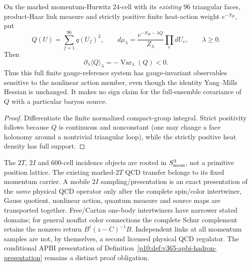 \documentclass[12pt,a4paper]{article}
\begin{document}
\begin{proposition}
\label{p10:prop:v3025-fullface-variance}
On the marked momentum-Hurwitz $24$-cell with its \emph{existing}
$96$ triangular faces, product-Haar link measure and strictly positive
finite heat-action weight $e^{-S_H}$, put
\[
 Q(U)=\sum_{f=1}^{96}q(U_f)^2,\qquad
 d\mu_\lambda=\frac{e^{-S_H-\lambda Q}}{Z_\lambda}
 \prod_{e}dU_e,\qquad \lambda\ge0.
\]
Then
\[
 \boxed{\partial_\lambda\langle Q\rangle_\lambda
 =-\operatorname{Var}_\lambda(Q)<0.}
\]
Thus this full finite gauge-reference system has gauge-invariant
observables sensitive to the nonlinear action member, even though the
identity Yang--Mills Hessian is unchanged.  It makes no sign claim for
the full-ensemble covariance of $Q$ with a particular baryon source.
\end{proposition}
\begin{proof}
Differentiate the finite normalized compact-group integral.
Strict positivity follows because $Q$ is continuous and nonconstant
(one may change a face holonomy around a nontrivial triangular loop),
while the strictly positive heat density has full support.
\end{proof}

\begin{remark}
\label{p10:rem:v3025-momentum-2i-action-owner}
The $2T$, $2I$ and $600$-cell incidence objects are rooted in
$S^3_{\rm mom}$, not a primitive position lattice.  The existing
marked-$2T$ QCD transfer belongs to its fixed momentum carrier.
A mobile $2I$ sampling/presentation is an exact presentation of the
\emph{same} physical QCD operator only after the complete spin/color
intertwiner, Gauss quotient, nonlinear action, quantum measure and
source maps are transported together.  Free/Cartan one-body
intertwiners have narrower stated domains; for general nonflat color
connections the complete Schur complement retains the nonzero return
$B^\dagger(z-C)^{-1}B$.  Independent links at all momentum samples
are not, by themselves, a second licensed physical QCD regulator.
The conditional APBI presentation of
Definition~\ref{p10:def:v365-apbi-hadron-presentation}
remains a distinct proof obligation.
\end{remark}
\end{document}
